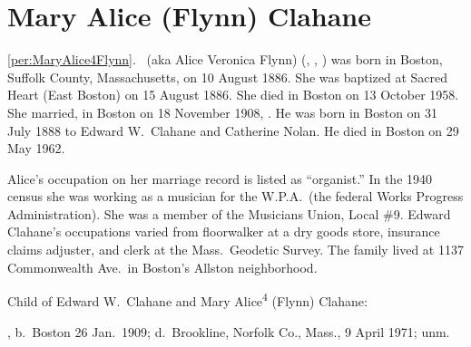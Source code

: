 \section{Mary Alice (Flynn) Clahane}

\ref{per:MaryAlice4Flynn}.\  (aka Alice Veronica Flynn) (, , ) was born in Boston, Suffolk County, Massachusetts, on 10 August 1886.\cite{MaryAlice4FlynnBirth} She was baptized at Sacred Heart (East Boston) on 15 August 1886.\cite{MaryAlice4FlynnBaptism} She died in Boston on 13 October 1958.\cite{MaryAlice4FlynnDeath} She married, in Boston on 18 November 1908, .\cite{MaryAlice4FlynnMarriage} He was born in Boston on 31 July 1888\cite{EdwardClahaneBirth} to Edward W.\ Clahane and Catherine Nolan.\cite{MaryAlice4FlynnMarriage} He died in Boston on 29 May 1962.\cite{EdwardClahaneDeath}

Alice's occupation on her marriage record is listed as ``organist.''\cite{MaryAlice4FlynnMarriage} In the 1940 census she was working as a musician for the W.P.A.\ (the federal Works Progress Administration).\cite{Census1940MaryAlice4Flynn} She was a member of the Musicians Union, Local \#9.\cite{MaryAlice4FlynnDeath} Edward Clahane's occupations varied from floorwalker at a dry goods store,\cite{Census1910EdwardClahane} insurance claims adjuster,\cite{Census1920EdwardClahane} and clerk at the Mass.\ Geodetic Survey.\cite{EdwardClahaneWWIIDraft} The family lived at 1137 Commonwealth Ave.\ in Boston's Allston neighborhood.\cite{Census1940MaryAlice4Flynn,MaryAlice4FlynnDeath}

\begin{KidsIntro}
	Child of Edward W.\ Clahane and Mary Alice\textsuperscript{4} (Flynn) Clahane:
\end{KidsIntro}

\begin{Kids}
	, b.\ Boston 26 Jan.\ 1909;\cite{Marion5ClahaneBirth} d.\ Brookline, Norfolk Co., Mass., 9 April 1971;\cite{Marion5ClahaneDeath} unm.
\end{Kids}